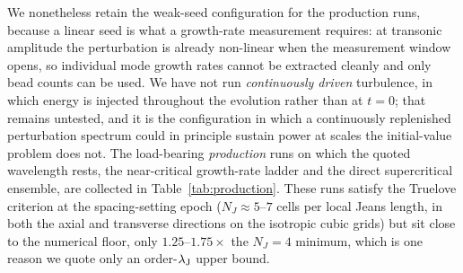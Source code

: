 \documentclass[usenatbib,twoside,twocolumn]{mnras}
\begin{document}
We nonetheless retain the weak-seed configuration for the production runs, because a linear seed is what a growth-rate measurement requires: at transonic amplitude the perturbation is already non-linear when the measurement window opens, so individual mode growth rates cannot be extracted cleanly and only bead counts can be used. We have not run \emph{continuously driven} turbulence, in which energy is injected throughout the evolution rather than at $t=0$; that remains untested, and it is the configuration in which a continuously replenished perturbation spectrum could in principle sustain power at scales the initial-value problem does not. The load-bearing \emph{production} runs on which the quoted wavelength rests, the near-critical growth-rate ladder and the direct supercritical ensemble, are collected in Table~\ref{tab:production}. These runs satisfy the Truelove criterion at the spacing-setting epoch ($N_J\approx5$--$7$ cells per local Jeans length, in both the axial and transverse directions on the isotropic cubic grids) but sit close to the numerical floor, only $1.25$--$1.75\times$ the $N_J=4$ minimum, which is one reason we quote only an order-$\lambda_{\rm J}$ upper bound.
\end{document}
